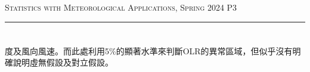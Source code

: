 \documentclass{article}
\begin{document}
\begin{CJK*}{UTF8}{bsmi}
\newpage
\thispagestyle{empty}
\hfill {\scshape \large Statistics with Meteorological Applications, Spring 2024} \hfill {\scshape P3}
\smallskip
\hrule    
\bigskip
\bigskip

\section*{}
    \begin{spacing}{2.5}
        \begin{large}
            度及風向風速。而此處利用5\%的顯著水準來判斷OLR的異常區域，但似乎沒有明確說明虛無假設及對立假設。
        \end{large}
    \end{spacing}


\end{CJK*}
\end{document}
